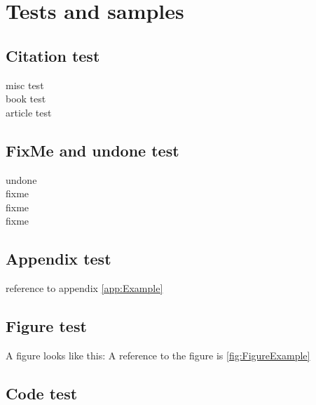 \section*{Tests and samples}
\label{sec:test}
\subsection*{Citation test}
misc test\cite{driessen2010git}\\
book test\cite{goossens1994latex}\\
article test\cite{noyes2008computer}

\subsection*{FixMe and undone test}
undone\\
fixme\\
fixme\\
fixme

\subsection*{Appendix test}
reference to appendix \ref{app:Example}

\subsection*{Figure test}
A figure looks like this:
A reference to the figure is \ref{fig:FigureExample}

\subsection*{Code test}
